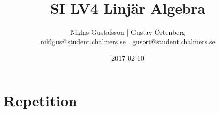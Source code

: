 \documentclass{article}
\title{SI LV4 Linjär Algebra}
\author{Niklas Gustafsson | Gustav Örtenberg  \\ \small{niklgus@student.chalmers.se} | \small{gusort@student.chalmers.se}}
\date{2017-02-10}
\begin{document}
\maketitle
\section*{Repetition}


\section{}


\section{}


\section{}


\section{}


\section{}


\section{}


\section{}

\end{document}
